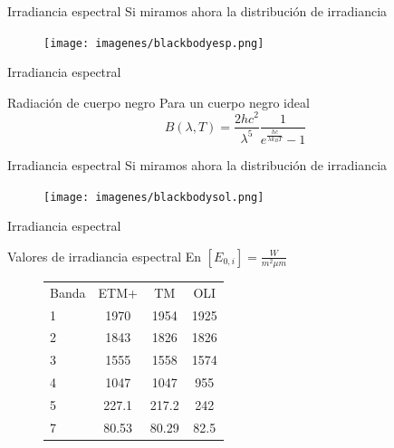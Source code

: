 \documentclass[]{beamer}
\begin{document}
\begin{frame}{Irradiancia espectral}
  Si miramos ahora la distribución de irradiancia
  \begin{figure}
    \texttt{[image: imagenes/blackbodyesp.png]}
  \end{figure}
\end{frame}

\begin{frame}{Irradiancia espectral}
  \begin{block}{Radiación de cuerpo negro}
    Para un cuerpo negro ideal
    \begin{equation}
      B(\lambda,T) = \frac{2hc^2}{\lambda^5}\frac{1}{e^{\frac{hc}{\lambda k_B T}}-1}
    \end{equation}
  \end{block}
\end{frame}

\begin{frame}{Irradiancia espectral}
  Si miramos ahora la distribución de irradiancia
  \begin{figure}
    \texttt{[image: imagenes/blackbodysol.png]}
  \end{figure}
\end{frame}

\begin{frame}{Irradiancia espectral}
  \begin{exampleblock}{Valores de irradiancia espectral}
    En $[E_{0,i}] = \frac{W}{m^2 \mu m}$
    \begin{figure}
      \begin{tabular}{l c c c}
          Banda & ETM+  & TM    &  OLI \\
          1     & 1970  & 1954  & 1925 \\
          2     & 1843  & 1826  & 1826 \\
          3     & 1555  & 1558  & 1574 \\
          4     & 1047  & 1047  & 955  \\
          5     & 227.1 & 217.2 & 242 \\
          7     & 80.53 & 80.29 & 82.5\\
      \end{tabular}
    \end{figure}
  \end{exampleblock}
\end{frame}
\end{document}
